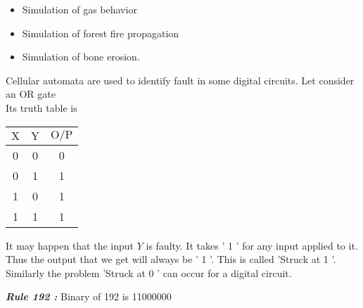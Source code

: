 \documentclass[a4]{article}
\begin{document}
{	\begin{itemize}
		\item Simulation of gas behavior\vspace*{0.1cm}
		\item Simulation of forest fire propagation\vspace*{0.1cm}
		\item Simulation of bone erosion.\vspace*{0.1cm}
	\end{itemize}
	Cellular automata are used to identify fault in some digital circuits. 
	Let consider an OR gate\\ 
	Its truth table is\\
	
	\vspace*{0.5cm}

	\begin{center}
		\begin{tabular}{ccc}
			\hline
			\centering
			$\mathrm{X}$ & $\mathrm{Y}$ & $\mathrm{O} / \mathrm{P}$ \\
			\hline 0 & 0 & 0 \\
			0 & 1 & 1 \\
			1 & 0 & 1 \\
			1 & 1 & 1 \\
			\hline
		\end{tabular}
	\end{center}

	\vspace*{0.5cm}
	
	It may happen that the input $Y$ is faulty. It takes ' 1 ' for any input applied to it. Thus the output that we get will always be ' 1 '. This is called 'Struck at 1 '. Similarly the problem 'Struck at 0 ' can occur for a digital circuit.
	\vspace*{0.5cm}\\
	\large{\textbf{\textit{{Rule 192 :}}}
    Binary of 192 is 11000000 

}}
\end{document}
